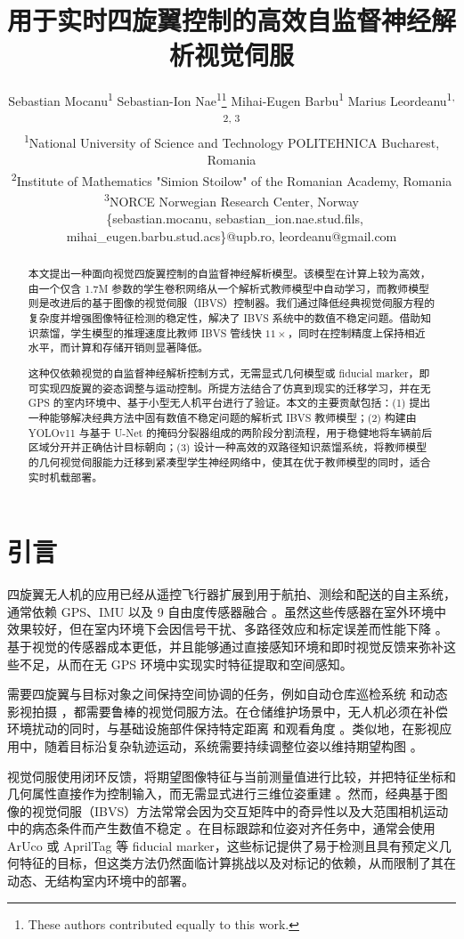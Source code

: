 \documentclass[10pt,twocolumn,letterpaper]{article}
\title{用于实时四旋翼控制的高效自监督神经解析视觉伺服}
\author{
Sebastian Mocanu\textsuperscript{1} \quad
Sebastian-Ion Nae\textsuperscript{1}\thanks{These authors contributed equally to this work.} \quad
Mihai-Eugen Barbu\textsuperscript{1}\footnotemark[1] \quad
Marius Leordeanu\textsuperscript{1, 2, 3} \\
\textsuperscript{1}National University of Science and Technology POLITEHNICA Bucharest, Romania \\
\textsuperscript{2}Institute of Mathematics "Simion Stoilow" of the Romanian Academy, Romania \\
\textsuperscript{3}NORCE Norwegian Research Center, Norway \\
{\footnotesize\ttfamily\ \{sebastian.mocanu, sebastian\_ion.nae.stud.fils, mihai\_eugen.barbu.stud.acs\}@upb.ro, leordeanu@gmail.com} 
}
\begin{document}
\maketitle

\begin{abstract}
本文提出一种面向视觉四旋翼控制的自监督神经解析模型。该模型在计算上较为高效，由一个仅含 1.7M 参数的学生卷积网络从一个解析式教师模型中自动学习，而教师模型则是改进后的基于图像的视觉伺服（IBVS）控制器。我们通过降低经典视觉伺服方程的复杂度并增强图像特征检测的稳定性，解决了 IBVS 系统中的数值不稳定问题。借助知识蒸馏，学生模型的推理速度比教师 IBVS 管线快 $11\times$，同时在控制精度上保持相近水平，而计算和存储开销则显著降低。

这种仅依赖视觉的自监督神经解析控制方式，无需显式几何模型或 fiducial marker，即可实现四旋翼的姿态调整与运动控制。所提方法结合了仿真到现实的迁移学习，并在无 GPS 的室内环境中、基于小型无人机平台进行了验证。本文的主要贡献包括：(1) 提出一种能够解决经典方法中固有数值不稳定问题的解析式 IBVS 教师模型；(2) 构建由 YOLOv11 与基于 U-Net 的掩码分裂器组成的两阶段分割流程，用于稳健地将车辆前后区域分开并正确估计目标朝向；(3) 设计一种高效的双路径知识蒸馏系统，将教师模型的几何视觉伺服能力迁移到紧凑型学生神经网络中，使其在优于教师模型的同时，适合实时机载部署。
\end{abstract}

\section{引言}
\label{sec:intro}
四旋翼无人机的应用已经从遥控飞行器扩展到用于航拍、测绘和配送的自主系统，通常依赖 GPS、IMU 以及 9 自由度传感器融合 \cite{arreola2018improvement}。虽然这些传感器在室外环境中效果较好，但在室内环境下会因信号干扰、多路径效应和标定误差而性能下降 \cite{tang2024control, rebbapragada2024c2fdrone}。基于视觉的传感器成本更低，并且能够通过直接感知环境和即时视觉反馈来弥补这些不足，从而在无 GPS 环境中实现实时特征提取和空间感知。

需要四旋翼与目标对象之间保持空间协调的任务，例如自动仓库巡检系统 \cite{wawrla2019applications} 和动态影视拍摄 \cite{nageli2017real}，都需要鲁棒的视觉伺服方法。在仓储维护场景中，无人机必须在补偿环境扰动的同时，与基础设施部件保持特定距离 \cite{kouris2018learning} 和观看角度 \cite{wawrla2019applications}。类似地，在影视应用中，随着目标沿复杂轨迹运动，系统需要持续调整位姿以维持期望构图 \cite{galvane2017automated}。

视觉伺服使用闭环反馈，将期望图像特征与当前测量值进行比较，并把特征坐标和几何属性直接作为控制输入，而无需显式进行三维位姿重建 \cite{hutchinson1996tutorial, guenard2008practical}。然而，经典基于图像的视觉伺服（IBVS）方法常常会因为交互矩阵中的奇异性以及大范围相机运动中的病态条件而产生数值不稳定 \cite{corke1996visual}。在目标跟踪和位姿对齐任务中，通常会使用 ArUco \cite{kalaitzakis2021fiducial, mraz2020using, cruz2024performance} 或 AprilTag \cite{olson2011apriltag, zhang2017autonomous, banik2025integrating} 等 fiducial marker，这些标记提供了易于检测且具有预定义几何特征的目标，但这类方法仍然面临计算挑战以及对标记的依赖，从而限制了其在动态、无结构室内环境中的部署。
\end{document}
